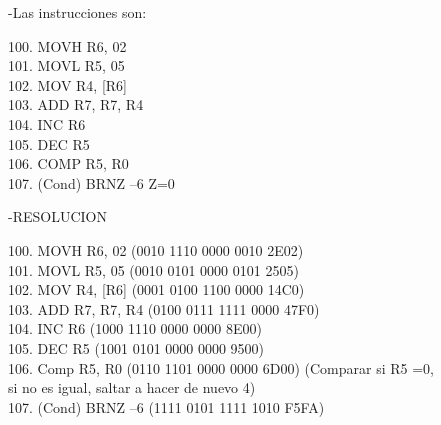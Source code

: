 \documentclass[a4paper,12pt]{article}
\begin{document}
	\hspace{1cm}-Las instrucciones son:
	\begin{flushleft}
		\hspace*{3cm}100. MOVH R6, 02 \\
		\hspace*{3cm}101. MOVL R5, 05 \\
		\hspace*{3cm}102. MOV R4, [R6] \\
		\hspace*{3cm}103. ADD R7, R7, R4 \\
		\hspace*{3cm}104. INC R6 \\
		\hspace*{3cm}105. DEC R5 \\
		\hspace*{3cm}106. COMP R5, R0 \\
		\hspace*{3cm}107. (Cond) BRNZ –6 Z=0 \\
	\end{flushleft}
	
	\hspace{1cm}-RESOLUCION
	\begin{flushleft}
		\hspace*{3cm}100. MOVH R6, 02 (0010 1110 0000 0010 2E02) \\
		\hspace*{3cm}101. MOVL R5, 05 (0010 0101 0000 0101 2505) \\
		\hspace*{3cm}102. MOV R4, [R6] (0001 0100 1100 0000 14C0) \\
		\hspace*{3cm}103. ADD R7, R7, R4 (0100 0111 1111 0000 47F0) \\
		\hspace*{3cm}104. INC R6 (1000 1110 0000 0000 8E00) \\
		\hspace*{3cm}105. DEC R5 (1001 0101 0000 0000 9500) \\
		\hspace*{3cm}106. Comp R5, R0 (0110 1101 0000 0000 6D00) (Comparar si R5 =0,\\
		\hspace*{4cm} si no es igual, saltar a hacer de nuevo 4) \\
		\hspace*{3cm}107. (Cond) BRNZ –6 (1111 0101 1111 1010 F5FA) \\
	\end{flushleft}
\end{document}
